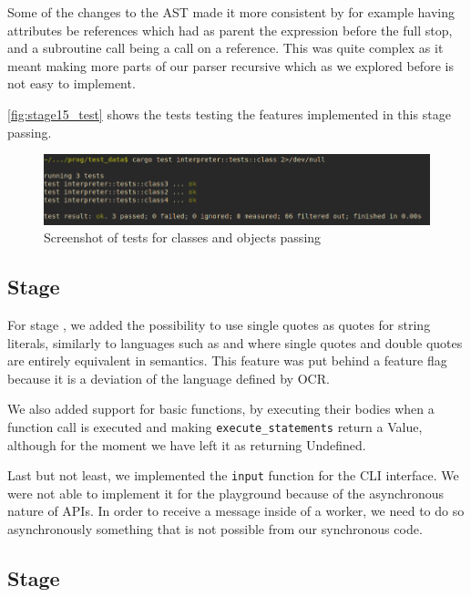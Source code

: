 \documentclass{article}
\newcommand{\subsecnum}{\the\value{subsection}}
\begin{document}
Some of the changes to the AST made it more consistent by for example having
attributes be references which had as parent the expression before the full
stop, and a subroutine call being a call on a reference. This was quite complex
as it meant making more parts of our parser recursive which as we explored
before is not easy to implement.

\autoref{fig:stage15_test} shows the tests testing the features implemented in
this stage passing.

\begin{figure}
	\includegraphics[width=\textwidth]{stage15_test}
	\caption{Screenshot of tests for classes and objects passing}
	\label{fig:stage15_test}
\end{figure}

\subsection{Stage \subsecnum}

For stage \subsecnum, we added the possibility to use single quotes as quotes
for string literals, similarly to languages such as  and
 where single quotes and double quotes are entirely
equivalent in semantics. This feature was put behind a feature flag because it
is a deviation of the language defined by OCR.

We also added support for basic functions, by executing their bodies when a
function call is executed and making \texttt{execute\_statements} return a
Value, although for the moment we have left it as returning Undefined.

Last but not least, we implemented the \texttt{input} function for the CLI
interface. We were not able to implement it for the playground because of the
asynchronous nature of  APIs. In order to receive a
message inside of a worker, we need to do so asynchronously something that is
not possible from our synchronous code.

\subsection{Stage \subsecnum}
\end{document}
